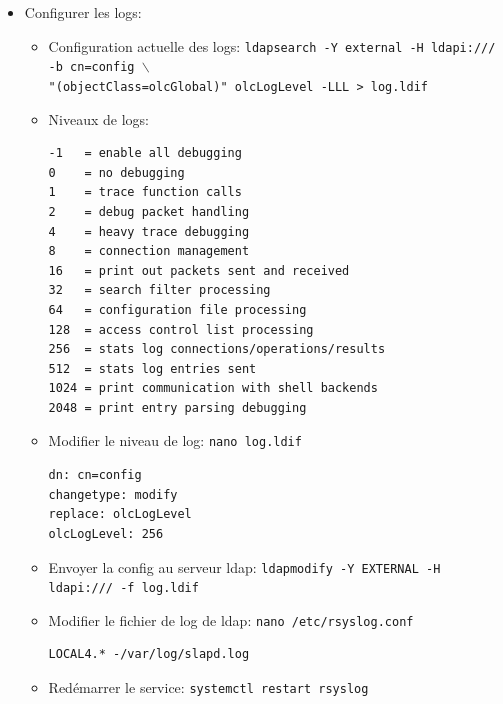 \documentclass[a4paper]{article}
\begin{document}
\begin{itemize}
\item Configurer les logs:
\begin{example} \begin{itemize}
    \item Configuration actuelle des logs: \texttt{ldapsearch -Y external -H ldapi:/// -b cn=config $\backslash$} \\
    \texttt{"(objectClass=olcGlobal)" olcLogLevel -LLL > log.ldif}
    \item Niveaux de logs:
\begin{example} \begin{verbatim}
-1   = enable all debugging
0    = no debugging
1    = trace function calls
2    = debug packet handling
4    = heavy trace debugging
8    = connection management
16   = print out packets sent and received
32   = search filter processing
64   = configuration file processing
128  = access control list processing
256  = stats log connections/operations/results
512  = stats log entries sent
1024 = print communication with shell backends
2048 = print entry parsing debugging
\end{verbatim} \end{example}
    \item Modifier le niveau de log: \texttt{nano log.ldif}
\begin{example} \begin{verbatim}
dn: cn=config
changetype: modify
replace: olcLogLevel
olcLogLevel: 256
\end{verbatim} \end{example}
    \item Envoyer la config au serveur ldap: \texttt{ldapmodify -Y EXTERNAL -H ldapi:/// -f log.ldif}
    \item Modifier le fichier de log de ldap: \texttt{nano /etc/rsyslog.conf}
\begin{example} \begin{verbatim}
LOCAL4.* -/var/log/slapd.log
\end{verbatim} \end{example}
    \item Redémarrer le service: \texttt{systemctl restart rsyslog}
\end{itemize} \end{example}



\end{itemize}
\end{document}
